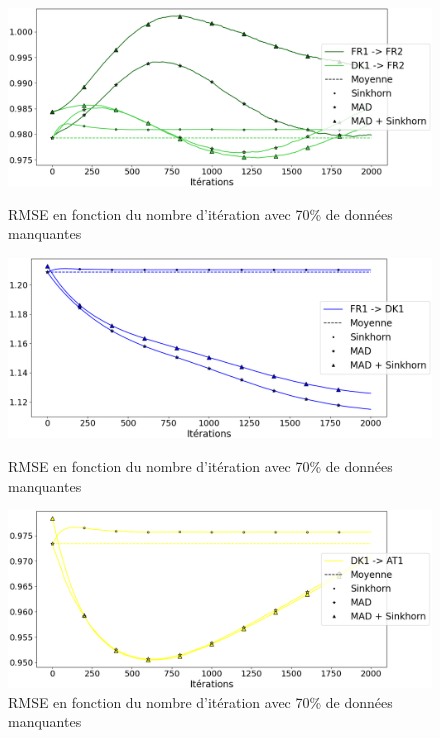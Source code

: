 \documentclass[acmsmall, natbib=false, nonacm]{acmart}
\begin{document}
\begin{figure}[H]
    \begin{minipage}[b]{0.4\linewidth}
		\centering \includegraphics[scale=0.14]{images/70_biais_FR2.png}
		\caption{RMSE en fonction du nombre d'itération avec 70\% de données manquantes}
	\end{minipage}\hfill
    \begin{minipage}[b]{0.4\linewidth}
		\centering \includegraphics[scale=0.14]{images/70_biais_DK1.png}
		\caption{RMSE en fonction du nombre d'itération avec 70\% de données manquantes}
	\end{minipage}\hfill
    \begin{minipage}[b]{0.4\linewidth}
		\centering \includegraphics[scale=0.14]{images/70_biais_AT1.png}
		\caption{RMSE en fonction du nombre d'itération avec 70\% de données manquantes}
	\end{minipage}
\end{figure}
\end{document}

